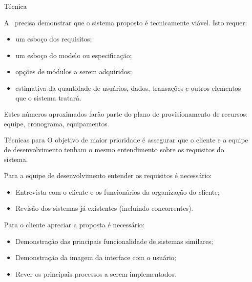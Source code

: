 \begin{frame}{\insertlecture}{Técnica}
  
  A \insertlecture\ precisa demonstrar que o sistema proposto é 
  tecnicamente viável. Isto requer:
  
  \begin{itemize}[<+->]
  \item um \alert{esboço} dos requisitos;
  \item um \alert{esboço} do modelo ou especificação;
  \item opções de módulos a serem adquiridos;
  \item \alert{estimativa} da quantidade de usuários, dados, transações e outros 
    elementos que o sistema tratará.
  \end{itemize}

  \pause\bigskip

  Estes números aproximados farão parte do plano de provisionamento de recursos: 
  equipe, cronograma, equipamentos.

\end{frame}

\begin{frame}{Técnicas para \insertlecture}
  O \alert{objetivo de maior prioridade} é assegurar que o cliente e a
  equipe de desenvolvimento tenham o mesmo entendimento sobre os
  requisitos do sistema.
  \pause\bigskip
  
  Para a \alert{equipe de desenvolvimento} entender os requisitos é necessário:
  \begin{itemize}[<+->]
  \item Entrevista com o cliente e os funcionários da organização do cliente;
  \item Revisão dos sistemas já existentes (incluindo concorrentes).
  \end{itemize}
  
  \pause\bigskip
  Para o \alert{cliente} apreciar a proposta é necessário:
  \begin{itemize}[<+->]
  \item Demonstração das principais funcionalidade de sistemas similares;
  \item Demonstração da imagem da interface com o usuário;
  \item Rever os principais processos a serem implementados.
  \end{itemize}
\end{frame}

